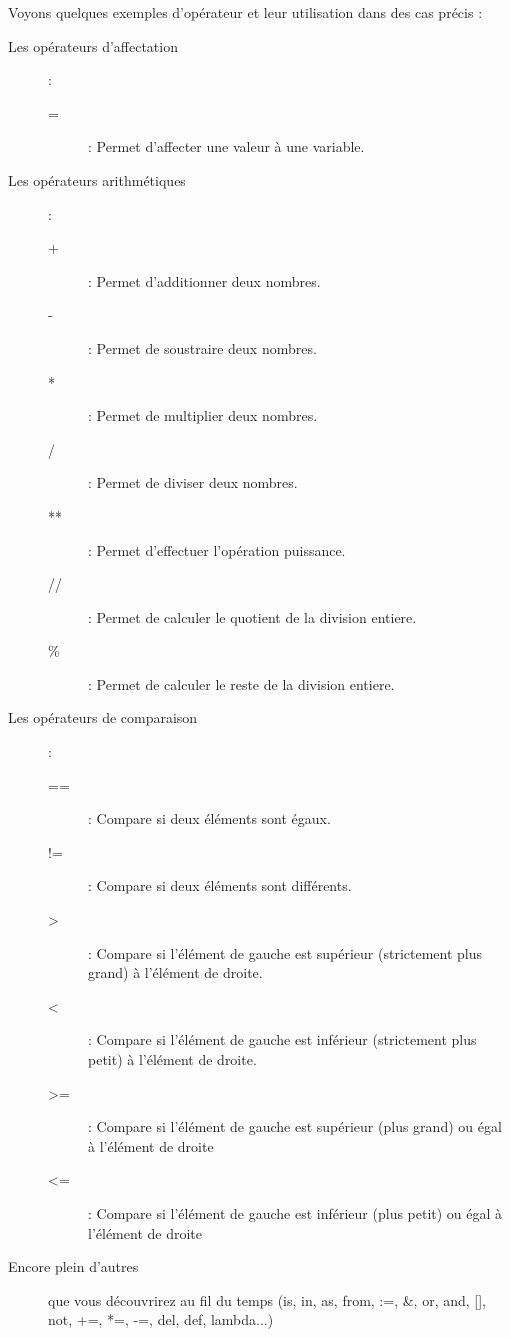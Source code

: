 Voyons quelques exemples d'opérateur et leur utilisation dans des cas précis : 
\begin{description}
    \item[Les opérateurs d'affectation] :
    \begin{description}
        \item[=] : Permet  d'affecter une valeur à une variable.
    \end{description}
    \item[Les opérateurs arithmétiques] :
    \begin{description}
        \item[+] : Permet d'additionner deux nombres.
        \item[-] : Permet de soustraire deux nombres.
        \item[*] : Permet de multiplier deux nombres.
        \item[/] : Permet de diviser deux nombres.
        \item[**] : Permet d'effectuer l'opération puissance.
        \item[//] : Permet de calculer le quotient de la division entiere.
        \item[\%] : Permet de calculer le reste de la division entiere.
    \end{description}
\item[Les opérateurs de comparaison] :
    \begin{description}
        \item[==] : Compare si deux éléments sont égaux.
        \item[!=] : Compare si deux éléments sont différents.
        \item[>] : Compare si l'élément de gauche est supérieur (strictement plus grand) à l'élément de droite.
        \item[<] : Compare si l'élément de gauche est inférieur (strictement plus petit) à l'élément de droite.
        \item[>=] : Compare si l'élément de gauche est supérieur (plus grand) ou égal à l'élément de droite
        \item[<=] : Compare si l'élément de gauche est inférieur (plus petit) ou égal à l'élément de droite
    \end{description}
    \item[Encore plein d'autres] que vous découvrirez au fil du temps (is, in, as, from, :=, \&, or, and, [], not, +=, *=,  -=, del, def, lambda...)
\end{description}

